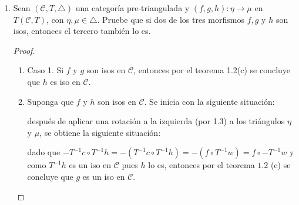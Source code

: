 \documentclass{article}
\begin{document}
\begin{enumerate}
\begin{proof}
\centerline{
}

Así, por ( TR3 ) existe $s:Z\to M$ tal que $1_M\circ t=sv$ y por lo tanto $v\in SCoKer(u)$.\\

Por último, rotando el triángulo de las hipótesis por ( TR1c ) se tiene que  está en $\triangle$, 
así por lo demostrado $v\in Ker(w)$ y $w\in CoKer(v)$.

\end{proof}

\item Sean $(\mathscr{C},T,\triangle)$ una categoría pre-triangulada y $(f,g,h):\eta \to \mu$ en $T(\mathscr{C},T)$, con $\eta ,\mu \in \triangle$. Pruebe que si dos de los tres morfismos $f,g$ y $h$ son isos, entonces el tercero también lo es.

\begin{proof}
\begin{enumerate}
\item Caso 1. Si $f$ y $g$ son isos en $\mathscr{C}$, entonces por el teorema 1.2(c) se concluye que $h$ es iso en $\mathscr{C}$.

\item Suponga que $f$ y $h$ son isos en $\mathscr{C}$. Se inicia con la siguiente situaci\'on:

\begin{center}
\end{center}

después de aplicar una rotación a la izquierda (por 1.3) a los triángulos $\eta$ y $\mu$, se obtiene la siguiente situaci\'on:

\begin{center}
\end{center}
dado que $-T^{-1}c \circ T^{-1}h=-(T^{-1}c \circ T^{-1}h)=-(f\circ T^{-1}w)=f\circ -T^{-1}w$ y como $T^{-1}h$ es un iso en $\mathscr{C}$ pues $h$ lo es, entonces por el teorema $1.2$ (c) se concluye que $g$ es un iso en $\mathscr{C}$. 


\end{enumerate}
\end{proof}
\end{enumerate}
\end{document}
